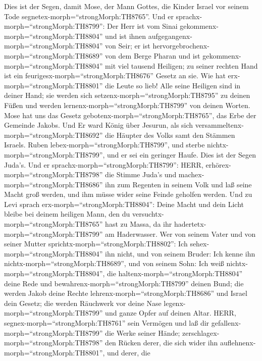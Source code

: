  Dies ist der Segen, damit Mose, der Mann Gottes, die Kinder
Israel vor seinem Tode segnetex-morph=``strongMorph:TH8765''.
 Und er sprachx-morph=``strongMorph:TH8799'': Der Herr ist
vom Sinai gekommenx-morph=``strongMorph:TH8804'' und ist ihnen
aufgegangenx-morph=``strongMorph:TH8804'' von Seir; er ist
hervorgebrochenx-morph=``strongMorph:TH8689'' von dem Berge Pharan und
ist gekommenx-morph=``strongMorph:TH8804'' mit viel tausend Heiligen; zu
seiner rechten Hand ist ein feurigesx-morph=``strongMorph:TH8676''
Gesetz an sie.  Wie hat erx-morph=``strongMorph:TH8801'' die
Leute so lieb! Alle seine Heiligen sind in deiner Hand; sie werden sich
setzenx-morph=``strongMorph:TH8795'' zu deinen Füßen und werden
lernenx-morph=``strongMorph:TH8799'' von deinen Worten. 
Mose hat uns das Gesetz gebotenx-morph=``strongMorph:TH8765'', das Erbe
der Gemeinde Jakobs.  Und Er ward König über Jesurun, als
sich versammeltenx-morph=``strongMorph:TH8692'' die Häupter des Volks
samt den Stämmen Israels.  Ruben
lebex-morph=``strongMorph:TH8799'', und sterbe
nichtx-morph=``strongMorph:TH8799'', und er sei ein geringer Haufe.
 Dies ist der Segen Juda's. Und er
sprachx-morph=``strongMorph:TH8799'': HERR,
erhörex-morph=``strongMorph:TH8798'' die Stimme Juda's und
machex-morph=``strongMorph:TH8686'' ihn zum Regenten in seinem Volk und
laß seine Macht groß werden, und ihm müsse wider seine Feinde geholfen
werden.  Und zu Levi sprach
erx-morph=``strongMorph:TH8804'': Deine Macht und dein Licht bleibe bei
deinem heiligen Mann, den du versuchtx-morph=``strongMorph:TH8765'' hast
zu Massa, da ihr hadertetx-morph=``strongMorph:TH8799'' am Haderwasser.
 Wer von seinem Vater und von seiner Mutter
sprichtx-morph=``strongMorph:TH8802'': Ich
sehex-morph=``strongMorph:TH8804'' ihn nicht, und von seinem Bruder: Ich
kenne ihn nichtx-morph=``strongMorph:TH8689'', und von seinem Sohn: Ich
weiß nichtx-morph=``strongMorph:TH8804'', die
haltenx-morph=``strongMorph:TH8804'' deine Rede und
bewahrenx-morph=``strongMorph:TH8799'' deinen Bund;  die
werden Jakob deine Rechte lehrenx-morph=``strongMorph:TH8686'' und
Israel dein Gesetz; die werden Räuchwerk vor deine Nase
legenx-morph=``strongMorph:TH8799'' und ganze Opfer auf deinen Altar.
 HERR, segnex-morph=``strongMorph:TH8761'' sein Vermögen
und laß dir gefallenx-morph=``strongMorph:TH8799'' die Werke seiner
Hände; zerschlagex-morph=``strongMorph:TH8798'' den Rücken derer, die
sich wider ihn auflehnenx-morph=``strongMorph:TH8801'', und derer, die
